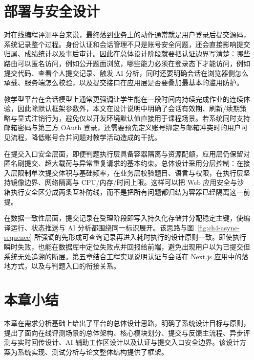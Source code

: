 \section{部署与安全设计}

对在线编程评测平台来说，最终落到业务上的动作通常就是用户登录后提交源码，系统记录整个过程。身份认证和会话管理不只是账号安全问题，还会直接影响提交归属、成绩统计以及事后审计。因此在总体设计阶段就要把认证边界写清楚：哪些路由可以匿名访问，例如公开题面浏览，哪些能力必须在登录态下才能访问，例如提交代码、查看个人提交记录、触发 AI 分析，同时还要明确会话在浏览器侧怎么承载、服务端怎么校验，以及提交接口在应用层是否要叠加最基本的滥用防护\cite{owasp2021top10}。

教学型平台在会话模型上通常更强调让学生能在一段时间内持续完成作业的连续体验，因此除默认框架参数外，本文在设计说明中明确了会话有效期、刷新/续期策略与显式注销行为，避免仅以开发环境默认值直接用于课程场景。若系统同时支持邮箱密码与第三方 OAuth 登录，还需要预先定义账号绑定与邮箱冲突时的用户可见流程，降低账号合并问题对教学活动造成的干扰。

在提交入口安全层面，即便判题执行层具备容器隔离与资源配额，应用层仍保留对匿名刷提交、超大载荷与异常重复请求的基本约束。总体设计采用分层控制：在接入层限制单次提交体积与基础频率，在业务层校验题目、语言与权限，在执行层坚持镜像边界、网络隔离与 CPU/内存/时间上限\cite{nist201716800190,owasp2021top10}。这样可以把 Web 应用安全与沙箱执行安全区分成两条互补防线，而不是把所有问题都归结为容器已经隔离这一前提。

在数据一致性层面，提交记录在受理阶段即写入持久化存储并分配稳定主键，使编译运行、状态推送与 AI 分析都围绕同一标识展开。该思路与图~\ref{fig:ch4-async-sequence} 所强调的先形成可查询记录再进入耗时执行的设计原则一致。即使执行瞬时失败，也能在数据库中定位失败点并回报给前端，避免出现用户以为已提交但系统无处追溯的断层。第五章结合工程实现说明认证与会话在 Next.js 应用中的落地方式，以及与判题入口的衔接关系。

\section{本章小结}

本章在需求分析基础上给出了平台的总体设计思路，明确了系统设计目标与原则，提出了面向在线评测场景的总体架构、核心模块划分、提交与反馈主流程、异步评测与实时回传设计、AI 辅助工作区设计以及认证与提交入口安全边界。该设计方案为系统实现、测试分析与论文整体结构提供了框架。
